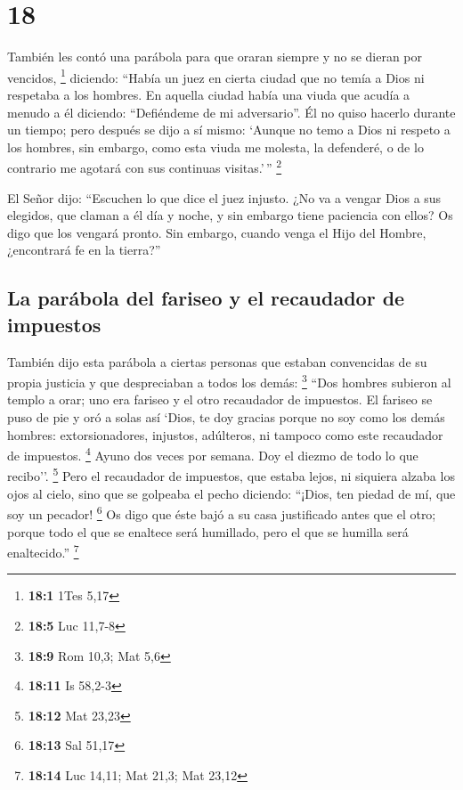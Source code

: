 \hypertarget{section-17}{%
\section{18}\label{section-17}}

 También les contó una parábola para que oraran siempre y
no se dieran por vencidos, \footnote{\textbf{18:1} 1Tes 5,17}
 diciendo: ``Había un juez en cierta ciudad que no temía a
Dios ni respetaba a los hombres.  En aquella ciudad había
una viuda que acudía a menudo a él diciendo: ``Defiéndeme de mi
adversario''.  Él no quiso hacerlo durante un tiempo; pero
después se dijo a sí mismo: `Aunque no temo a Dios ni respeto a los
hombres,  sin embargo, como esta viuda me molesta, la
defenderé, o de lo contrario me agotará con sus continuas visitas.'\,''
\footnote{\textbf{18:5} Luc 11,7-8}

 El Señor dijo: ``Escuchen lo que dice el juez injusto.
 ¿No va a vengar Dios a sus elegidos, que claman a él día
y noche, y sin embargo tiene paciencia con ellos?  Os digo
que los vengará pronto. Sin embargo, cuando venga el Hijo del Hombre,
¿encontrará fe en la tierra?''

\hypertarget{la-paruxe1bola-del-fariseo-y-el-recaudador-de-impuestos}{%
\subsection{La parábola del fariseo y el recaudador de
impuestos}\label{la-paruxe1bola-del-fariseo-y-el-recaudador-de-impuestos}}

 También dijo esta parábola a ciertas personas que estaban
convencidas de su propia justicia y que despreciaban a todos los demás:
\footnote{\textbf{18:9} Rom 10,3; Mat 5,6}  ``Dos hombres
subieron al templo a orar; uno era fariseo y el otro recaudador de
impuestos.  El fariseo se puso de pie y oró a solas así
`Dios, te doy gracias porque no soy como los demás hombres:
extorsionadores, injustos, adúlteros, ni tampoco como este recaudador de
impuestos. \footnote{\textbf{18:11} Is 58,2-3}  Ayuno dos
veces por semana. Doy el diezmo de todo lo que recibo''. \footnote{\textbf{18:12}
  Mat 23,23}  Pero el recaudador de impuestos, que estaba
lejos, ni siquiera alzaba los ojos al cielo, sino que se golpeaba el
pecho diciendo: ``¡Dios, ten piedad de mí, que soy un pecador!
\footnote{\textbf{18:13} Sal 51,17}  Os digo que éste
bajó a su casa justificado antes que el otro; porque todo el que se
enaltece será humillado, pero el que se humilla será enaltecido.''
\footnote{\textbf{18:14} Luc 14,11; Mat 21,3; Mat 23,12}

